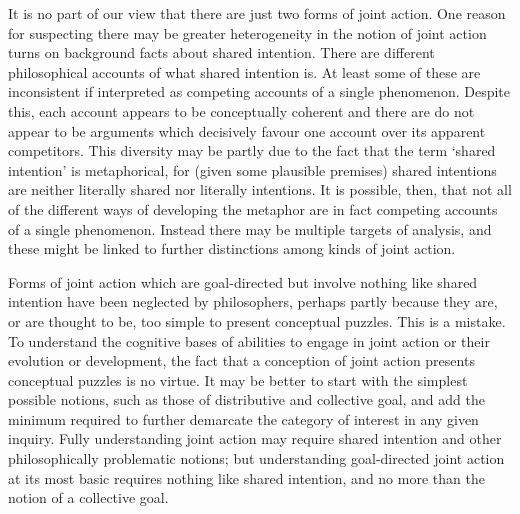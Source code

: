 \documentclass[12pt,a4paper]{extarticle}
\begin{document}
It is no part of our view that there are just two forms of joint action.  
One reason for suspecting there may be greater heterogeneity in the notion of joint action turns on background facts about shared intention.
There are different philosophical accounts of what shared intention is.  
At least some of these are inconsistent if interpreted as competing accounts of a single phenomenon.
Despite this, each account appears to be conceptually coherent and there are do not appear to be arguments which decisively favour one account over its apparent competitors.
This diversity may be partly due to the fact that the term `shared intention' is metaphorical, for (given some plausible premises) shared intentions are neither literally shared nor literally intentions.  
It is possible, then, that not all of the different ways of developing the metaphor are in fact competing accounts of a single phenomenon.
Instead there may be multiple targets of analysis, and these might be linked to further distinctions among kinds of joint action.

Forms of joint action which are goal-directed but involve nothing like shared intention have been neglected by philosophers, perhaps 
partly because they are, or are thought to be, too simple to present conceptual puzzles.
This is a mistake.  
To understand the cognitive bases of abilities to engage in joint action or their evolution or development, the fact that a conception of joint action presents conceptual puzzles is no virtue.
It may be better to start with the simplest possible notions, such as those of distributive and collective goal, and add the minimum required to further demarcate the category of interest in any given inquiry.
Fully understanding joint action may require shared intention and other philosophically problematic notions; but
understanding goal-directed joint action at its most basic requires nothing like shared intention, and no more than the notion of a collective goal.


\end{document}
